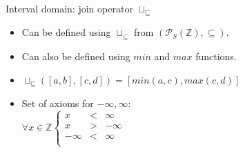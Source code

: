 \begin{frame}{Interval domain: join operator  $\sqcup_{\scriptscriptstyle \sqsubseteq}$}
\begin{itemize}
	\item Can be defined using  $\sqcup_\subseteq$ from $(\mathcal{P}_S(\mathbb{Z}), \subseteq)$.
	\item Can also be defined using $min$ and $max$ functions.
	\item $\sqcup_{\scriptscriptstyle \sqsubseteq}([a,b],[c,d])=[min(a,c),max(c,d)]$
	\item Set of axioms for $-\infty, \infty$:\\
	
	$  \forall x \in \mathbb{Z}     \left\{ \begin{array}{lcc}
	x  &  < & \infty  \\
	x  &  > & -\infty   \\
	-\infty &  < & \infty \\
\end{array}\right.$
\end{itemize}
\end{frame}

